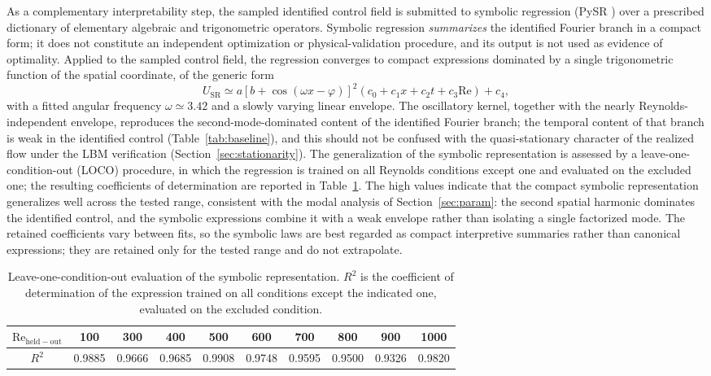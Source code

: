 \documentclass[aip,pof,reprint,superscriptaddress]{revtex4-2}
\newcommand{\re}{\mathrm{Re}}
\begin{document}
As a complementary interpretability step, the sampled identified control field is submitted to symbolic regression (PySR \cite{cranmer2023pysr}) over a prescribed dictionary of elementary algebraic and trigonometric operators. Symbolic regression \emph{summarizes} the identified Fourier branch in a compact form; it does not constitute an independent optimization or physical-validation procedure, and its output is not used as evidence of optimality. Applied to the sampled control field, the regression converges to compact expressions dominated by a single trigonometric function of the spatial coordinate, of the generic form
\begin{equation}\label{eq:sr}
U_{\mathrm{SR}}\simeq a\left[b+\cos(\omega x-\varphi)\right]^{2}\left(c_{0}+c_{1}x+c_{2}t+c_{3}\re\right)+c_{4},
\end{equation}
with a fitted angular frequency $\omega\simeq3.42$ and a slowly varying linear envelope. The oscillatory kernel, together with the nearly Reynolds-independent envelope, reproduces the second-mode-dominated content of the identified Fourier branch; the temporal content of that branch is weak in the identified control (Table~\ref{tab:baseline}), and this should not be confused with the quasi-stationary character of the realized flow under the LBM verification (Section~\ref{sec:stationarity}). The generalization of the symbolic representation is assessed by a leave-one-condition-out (LOCO) procedure, in which the regression is trained on all Reynolds conditions except one and evaluated on the excluded one; the resulting coefficients of determination are reported in Table~\ref{tab:loco}. The high values indicate that the compact symbolic representation generalizes well across the tested range, consistent with the modal analysis of Section~\ref{sec:param}: the second spatial harmonic dominates the identified control, and the symbolic expressions combine it with a weak envelope rather than isolating a single factorized mode. The retained coefficients vary between fits, so the symbolic laws are best regarded as compact interpretive summaries rather than canonical expressions; they are retained only for the tested range and do not extrapolate.

\begin{table}[t]
\caption{\label{tab:loco} Leave-one-condition-out evaluation of the symbolic representation. $R^2$ is the coefficient of determination of the expression trained on all conditions except the indicated one, evaluated on the excluded condition.}
\centering
\begin{tabular}{cccccccccc}
\toprule
$\re_{\mathrm{held-out}}$ & 100 & 300 & 400 & 500 & 600 & 700 & 800 & 900 & 1000 \\
\midrule
$R^2$ & 0.9885 & 0.9666 & 0.9685 & 0.9908 & 0.9748 & 0.9595 & 0.9500 & 0.9326 & 0.9820 \\
\bottomrule
\end{tabular}
\end{table}
\end{document}

